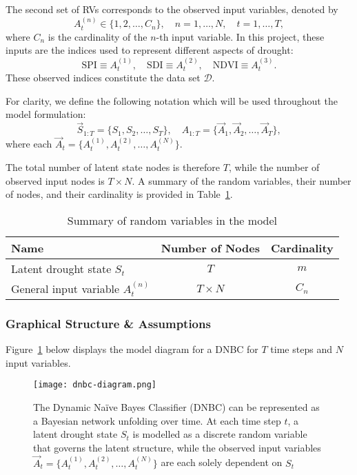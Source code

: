 The second set of RVs corresponds to the observed input variables, denoted by
\[
A_t^{(n)} \in \{1,2,\dots,C_n\}, \quad n = 1, \dots, N, \quad t = 1, \dots, T,
\]
where $C_n$ is the cardinality of the $n$-th input variable. In this project, these inputs are the indices used to represent different aspects of drought:
\[
\text{SPI} \equiv A_t^{(1)}, \quad 
\text{SDI} \equiv A_t^{(2)}, \quad 
\text{NDVI} \equiv A_t^{(3)}.
\]
These observed indices constitute the data set $\mathcal{D}$.  

For clarity, we define the following notation which will be used throughout the model formulation:
\[
\vec{S}_{1:T} = \{S_1, S_2, \dots, S_T\}, \quad 
A_{1:T} = \{\vec{A}_1, \vec{A}_2, \dots, \vec{A}_T\},
\]
where each $\vec{A}_t = \{A_t^{(1)}, A_t^{(2)}, \dots, A_t^{(N)}\}$.  

The total number of latent state nodes is therefore $T$, while the number of observed input nodes is $T \times N$. A summary of the random variables, their number of nodes, and their cardinality is provided in Table~\ref{tab:RVs}.

\begin{table}[H]
\centering
\caption{Summary of random variables in the model}
\label{tab:RVs}
\begin{tabular}{lcc}
\hline
\textbf{Name} & \textbf{Number of Nodes} & \textbf{Cardinality} \\ \hline
Latent drought state $S_t$ & $T$ & $m$ \\
General input variable $A_t^{(n)}$ & $T \times N$ & $C_n$ \\
\hline
\end{tabular}
\end{table}

\subsubsection{Graphical Structure \& Assumptions}

Figure~\ref{fig:dnbc-diagram} below displays the model diagram for a DNBC for $T$ time steps and $N$ input variables.  

\begin{figure}[!h]
    \centering
    \texttt{[image: dnbc-diagram.png]}
    \caption[TODO]{
The Dynamic Naïve Bayes Classifier (DNBC) can be represented as a Bayesian network unfolding over time. At each time step $t$, a latent drought state $S_t$ is modelled as a discrete random variable that governs the latent structure, while the observed input variables $\vec{A}_t = \{A_t^{(1)}, A_t^{(2)}, \dots, A_t^{(N)}\}$ are each solely dependent on $S_t$}
    \label{fig:dnbc-diagram}
\end{figure}

